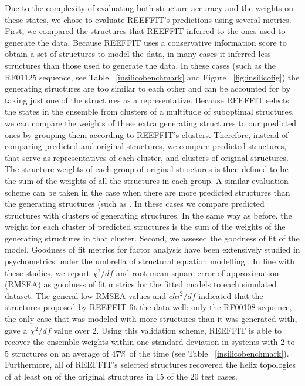 \documentclass[12pt]{article}
\begin{document}
Due to the complexity of evaluating both structure accuracy and the weights on these states, we chose to evaluate REEFFIT's predictions using several metrics. 
First, we compared the structures that REEFFIT inferred to the ones used to generate the data. 
Because REEFFIT uses a conservative information score to obtain a set of structures to model the data, in many cases it inferred less structures than those used to generate the data. 
In these cases (such as the RF01125 sequence, see Table ~\ref{insilicobenchmark} and Figure ~\ref{fig:insilicofig}) the generating structures are too similar to each other and can be accounted for by taking just one of the structures as a representative. 
Because REEFFIT selects the states in the ensemble from clusters of a multitude of suboptimal structures, we can compare the weights of these extra generating structures to our predicted ones by grouping them according to REEFFIT's clusters. 
Therefore, instead of comparing predicted and original structures, we compare predicted structures, that serve as representatives of each cluster, and clusters of original structures. 
The structure weights of each group of original structures is then defined to be the sum of the weights of all the structures in each group. 
A similar evaluation scheme can be taken in the case when there are more predicted structures than the generating structures (such as . 
In these cases we compare predicted structures with clusters of generating structures. In the same way as before, the weight for each cluster of predicted structures is the sum of the weights of the generating structures in that cluster. 
Second, we assesed the goodness of fit of the model. 
Goodness of fit metrics for factor analysis have been extensively studied in psychometrics under the umbrella of structural equation modelling \cite{Schreiber2006,Marsh1988,Babyak2010}. 
In line with these studies, we report $\chi^2/df$ and root mean square error of approximation (RMSEA) as goodness of fit metrics for the fitted models to each simulated dataset. 
The general low RMSEA values and $chi^2/df$ indicated that the structures proposed by REEFFIT fit the data well: only the RF00108 sequence, the only case that was modeled with more structures than it was generated with, gave a $\chi^2/df$ value over 2.  
Using this validation scheme, REEFFIT is able to recover the ensemble weights within one standard deviation in systems with 2 to 5 structures on an average of 47\% of the time (see Table ~\ref{insilicobenchmark}). 
Furthermore, all of REEFFIT's selected structures recovered the helix topologies of at least on of the original structures in 15 of the 20 test cases.
\end{document}
